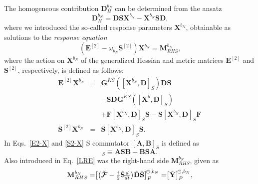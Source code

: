 \documentclass[%
 reprint,
 amsmath,amssymb,
 aps,
]{revtex4-1}
\begin{document}
The homogeneous contribution $\mathbf{D}_{H}^{b_N}$ can be determined from the ansatz 
\begin{equation}\label{D-H-bn}
\mathbf{D}_{H}^{b_N} = \mathbf{D} \mathbf{S} \mathbf{X}^{b_N} -  \mathbf{X}^{b_N} \mathbf{S} \mathbf{D} \text{,}
\end{equation}
where we introduced the so-called response parameters $\mathbf{X}^{b_N}$, obtainable as solutions to the \textit{response equation}
\begin{equation}
\label{LRE}
(\mathbf{E}^{[2]} - \omega_{b_N} \mathbf{S}^{[2]}) \mathbf{X}^{b_N} = \mathbf{M}_{RHS}^{b_N}\text{,}
\end{equation}
where the action on $\mathbf{X}^{b_N}$ of the generalized Hessian and metric matrices $\mathbf{E}^{[2]}$ and $\mathbf{S}^{[2]}$, respectively, is defined as follows:
\begin{eqnarray}\label{E2-X}
\mathbf{E}^{[2]} \mathbf{X}^{b_{N}}  &=&
\mathbf{G}^{KS}([\mathbf{X}^{b_{N}}, \mathbf{D}]_S) \mathbf{D} \mathbf{S} 
\\ \nonumber && - \mathbf{S} \mathbf{D} \mathbf{G}^{KS}([\mathbf{X}^b, \mathbf{D}]_S) 
\\ \nonumber && +
\mathbf{F} [\mathbf{X}^{b_{N}},\mathbf{D}]_S \mathbf{S} 
- \mathbf{S} [\mathbf{X}^{b_{N}},\mathbf{D}]_S \mathbf{F} 
\\ \label{S2-X}
\mathbf{S}^{[2]} \mathbf{X}^{b_{N}} &=& 
\mathbf{S} [\mathbf{X}^{b_{N}},\mathbf{D}]_S \mathbf{S} \text{.}
\end{eqnarray}
In Eqs.~\eqref{E2-X} and \eqref{S2-X} S commutator $[\mathbf{A}, \mathbf{B}]_S$ is defined as
\begin{equation}
[\mathbf{A}, \mathbf{B}]_S \equiv \mathbf{ASB} - \mathbf{BSA}\text{.}
\end{equation}
Also introduced in Eq.~\eqref{LRE} was the right-hand side $\mathbf{M}_{RHS}^{b_N}$, given as
\begin{eqnarray}\label{MRHS}
\mathbf{M}_{RHS}^{b_N} = \bigr[\bigl(\tilde{\mbox{\boldmath $ \mathcal{F} $}} - {\textstyle \frac{i}{2}} \tilde{\mathbf{S}} 
\!{\textstyle \frac{d}{dt}} \bigr) \tilde{\mathbf{D}} \tilde{\mathbf{S}} \bigr]^{\negmedspace \circleddash, b_N}_{ P } = \bigr[ \tilde{\mathbf{Y}} \bigr]^{\negmedspace \circleddash, b_N}_{ P } \text{,}
\end{eqnarray}
\end{document}
